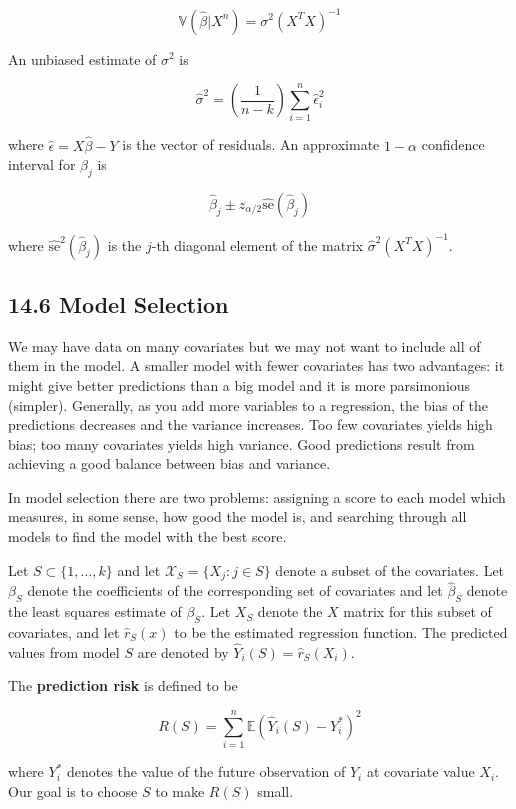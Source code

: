 \[ \mathbb{V}(\hat{\beta} | X^n) = \sigma^2 (X^T X)^{-1} \]

An unbiased estimate of \(\sigma^2\) is

\[ \hat{\sigma}^2 = \left( \frac{1}{n - k} \right) \sum_{i=1}^n \hat{\epsilon}_i^2 \]

where \(\hat{\epsilon} = X \hat{\beta} - Y\) is the vector of residuals.
An approximate \(1 - \alpha\) confidence interval for \(\beta_j\) is

\[ \hat{\beta}_j \pm z_{\alpha/2} \hat{\text{se}}(\hat{\beta}_j) \]

where \(\hat{\text{se}}^2(\hat{\beta}_j)\) is the \(j\)-th diagonal
element of the matrix \(\hat{\sigma}^2 (X^T X)^{-1}\).

\subsection{14.6 Model Selection}\label{model-selection}

We may have data on many covariates but we may not want to include all
of them in the model. A smaller model with fewer covariates has two
advantages: it might give better predictions than a big model and it is
more parsimonious (simpler). Generally, as you add more variables to a
regression, the bias of the predictions decreases and the variance
increases. Too few covariates yields high bias; too many covariates
yields high variance. Good predictions result from achieving a good
balance between bias and variance.

In model selection there are two problems: assigning a score to each
model which measures, in some sense, how good the model is, and
searching through all models to find the model with the best score.

Let \(S \subset \{1, \dots, k\}\) and let
\(\mathcal{X}_S = \{ X_j : j \in S \}\) denote a subset of the
covariates. Let \(\beta_S\) denote the coefficients of the corresponding
set of covariates and let \(\hat{\beta}_S\) denote the least squares
estimate of \(\beta_S\). Let \(X_S\) denote the \(X\) matrix for this
subset of covariates, and let \(\hat{r}_S(x)\) to be the estimated
regression function. The predicted values from model \(S\) are denoted
by \(\hat{Y}_i(S) = \hat{r}_S(X_i)\).

The \textbf{prediction risk} is defined to be

\[R(S) = \sum_{i=1}^n \mathbb{E} (\hat{Y}_i(S) - Y_i^*)^2 \]

where \(Y_i^*\) denotes the value of the future observation of \(Y_i\)
at covariate value \(X_i\). Our goal is to choose \(S\) to make \(R(S)\)
small.

